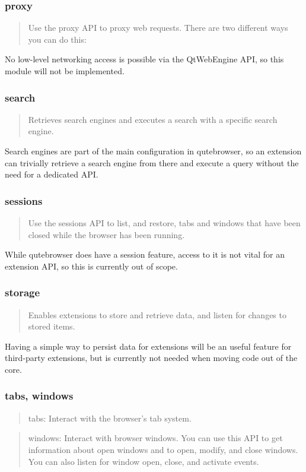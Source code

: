 \documentclass[a4paper,parskip=full]{scrreprt}
\begin{document}
\subsubsection{proxy}
\begin{quote}
Use the proxy API to proxy web requests. There are two different ways you can do this:
\end{quote}

No low-level networking access is possible via the QtWebEngine API, so this
module will not be implemented.

\subsubsection{search}
\begin{quote}
Retrieves search engines and executes a search with a specific search engine.
\end{quote}

Search engines are part of the main configuration in qutebrowser, so an
extension can trivially retrieve a search engine from there and execute a query
without the need for a dedicated API.

\subsubsection{sessions}
\begin{quote}
Use the sessions API to list, and restore, tabs and windows that have been closed while the browser has been running.
\end{quote}

While qutebrowser does have a session feature, access to it is not vital for an
extension API, so this is currently out of scope.

\subsubsection{storage}
\begin{quote}
Enables extensions to store and retrieve data, and listen for changes to stored items.
\end{quote}

Having a simple way to persist data for extensions will be an useful feature for
third-party extensions, but is currently not needed when moving code out of the core.

\subsubsection{tabs, windows}
\begin{quote}
tabs: Interact with the browser's tab system.
\end{quote}
\begin{quote}
windows: Interact with browser windows. You can use this API to get information about open windows and to open, modify, and close windows. You can also listen for window open, close, and activate events.
\end{quote}
\end{document}
